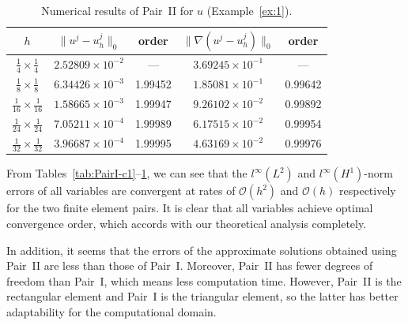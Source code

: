 \documentclass[a4paper,fleqn]{cas-sc}
\numberwithin{equation}{section}
\theoremstyle{definition}
\begin{document}
\begin{table}[htbp]
\centering
\caption{Numerical results of Pair~II for $u$ (Example~\ref{ex:1}).}
\label{tab:PairII-u}
\begin{tabular}{ccccc}
\hline
$h$ &
$\|u^{j} - u_{h}^{j}\|_{0}$ & order &
$\|\nabla(u^{j} - u_{h}^{j})\|_{0}$ & order \\
\hline
$\tfrac{1}{4} \times \tfrac{1}{4}$   & $2.52809\times10^{-2}$ & ---     & $3.69245\times10^{-1}$ & ---     \\
$\tfrac{1}{8} \times \tfrac{1}{8}$   & $6.34426\times10^{-3}$ & 1.99452 & $1.85081\times10^{-1}$ & 0.99642 \\
$\tfrac{1}{16}\times \tfrac{1}{16}$  & $1.58665\times10^{-3}$ & 1.99947 & $9.26102\times10^{-2}$ & 0.99892 \\
$\tfrac{1}{24}\times \tfrac{1}{24}$  & $7.05211\times10^{-4}$ & 1.99989 & $6.17515\times10^{-2}$ & 0.99954 \\
$\tfrac{1}{32}\times \tfrac{1}{32}$  & $3.96687\times10^{-4}$ & 1.99995 & $4.63169\times10^{-2}$ & 0.99976 \\
\hline
\end{tabular}
\end{table}

From Tables~\ref{tab:PairI-c1}--\ref{tab:PairII-u}, we can see that the $l^{\infty}(L^{2})$
and $l^{\infty}(H^{1})$-norm errors of all variables are convergent at rates of
$\mathcal{O}(h^{2})$ and $\mathcal{O}(h)$ respectively for the two finite element pairs. It
is clear that all variables achieve optimal convergence order, which accords with our
theoretical analysis completely.

In addition, it seems that the errors of the approximate solutions obtained using Pair~II are
less than those of Pair~I. Moreover, Pair~II has fewer degrees of freedom than Pair~I, which
means less computation time. However, Pair~II is the rectangular element and Pair~I is the
triangular element, so the latter has better adaptability for the computational domain.
\end{document}
